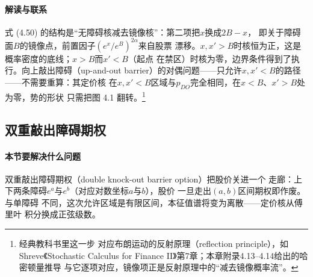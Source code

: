 \paragraph{解读与联系}
式 (4.50) 的结构是“无障碍核减去镜像核”：第二项把$x$换成$2B-x$，
即关于障碍面$B$的镜像点，前置因子$(e^{x}/e^{B})^{2\alpha}$来自股票
漂移。$x,x'>B$时核恒为正，这是概率密度的底线；$x>B$而$x'<B$（起点
在禁区）时核为零，边界条件得到了执行。向上敲出障碍（up-and-out
barrier）的对偶问题——只允许$x,x'<B$的路径——不需要重算：其定价核
在$x,x'<B$区域与$p_{DO}$完全相同，在$x<B$、$x'>B$处为零，势的形状
只需把图 4.1 翻转。\footnote{经典教科书里这一步
对应布朗运动的反射原理（reflection principle），如Shreve《Stochastic
Calculus for Finance II》第7章；本章附录4.13--4.14给出的哈密顿量推导
与它逐项对应，镜像项正是反射原理中的“减去镜像概率流”。}

\subsection{双重敲出障碍期权}

\paragraph{本节要解决什么问题}
双重敲出障碍期权（double knock-out barrier option）把股价关进一个
走廊：上下两条障碍$e^{a}$与$e^{b}$（对应对数坐标$a$与$b$），股价
一旦走出$(a,b)$区间期权即作废。与单障碍
不同，这次允许区域是有限区间，本征值谱将变为离散——定价核从傅里叶
积分换成正弦级数。

